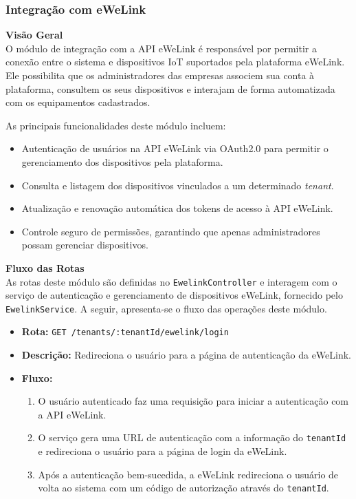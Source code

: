 \subsubsection{Integração com eWeLink}\label{subsubsec:integacao_ewelink}

\noindent\textbf{Visão Geral} \\
O módulo de integração com a API eWeLink é responsável por permitir a conexão entre o sistema e dispositivos IoT suportados pela plataforma eWeLink. Ele possibilita que os administradores das empresas associem sua conta à plataforma, consultem os seus dispositivos e interajam de forma automatizada com os equipamentos cadastrados.

As principais funcionalidades deste módulo incluem:

\begin{itemize}
    \item Autenticação de usuários na API eWeLink via OAuth2.0 para permitir o gerenciamento dos dispositivos pela plataforma.
    \item Consulta e listagem dos dispositivos vinculados a um determinado \textit{tenant}.
    \item Atualização e renovação automática dos tokens de acesso à API eWeLink.
    \item Controle seguro de permissões, garantindo que apenas administradores possam gerenciar dispositivos.
\end{itemize}

\noindent\textbf{Fluxo das Rotas} \\
As rotas deste módulo são definidas no \texttt{EwelinkController} e interagem com o serviço de autenticação e gerenciamento de dispositivos eWeLink, fornecido pelo \texttt{EwelinkService}. A seguir, apresenta-se o fluxo das operações deste módulo.

\begin{itemize}
    \item \textbf{Rota:} \texttt{GET /tenants/:tenantId/ewelink/login}
    \item \textbf{Descrição:} Redireciona o usuário para a página de autenticação da eWeLink.
    \item \textbf{Fluxo:}
    \begin{enumerate}
        \item O usuário autenticado faz uma requisição para iniciar a autenticação com a API eWeLink.
        \item O serviço gera uma URL de autenticação com a informação do \texttt{tenantId} e redireciona o usuário para a página de login da eWeLink.
        \item Após a autenticação bem-sucedida, a eWeLink redireciona o usuário de volta ao sistema com um código de autorização através do \texttt{tenantId}.
    \end{enumerate}
\end{itemize}

